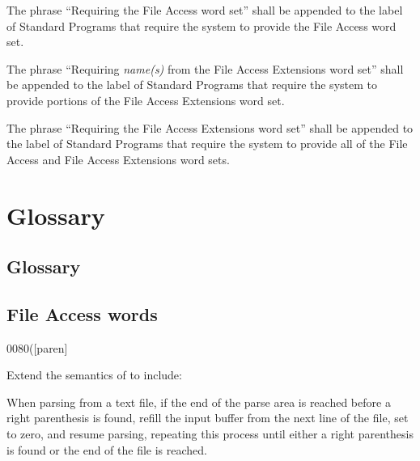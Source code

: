The phrase ``Requiring the File Access word set'' shall be appended
to the label of Standard Programs that require the system to provide
the File Access word set.

The phrase ``Requiring \emph{name(s)} from the File Access Extensions
word set'' shall be appended to the label of Standard Programs that
require the system to provide portions of the File Access Extensions
word set.

The phrase ``Requiring the File Access Extensions word set'' shall be
appended to the label of Standard Programs that require the system to
provide all of the File Access and File Access Extensions word sets.


\section{Glossary} %

\begin{intro}
\subsection{Glossary} %
\end{intro}

\subsection{File Access words} %

\begin{worddef}[p]{0080}{(}[paren]
\item {}

	Extend the semantics of  to include:

	When parsing from a text file, if the end of the parse area is
	reached before a right parenthesis is found, refill the input
	buffer from the next line of the file, set  to
	zero, and resume parsing, repeating this process until either a
	right parenthesis is found or the end of the file is reached.
\end{worddef}


